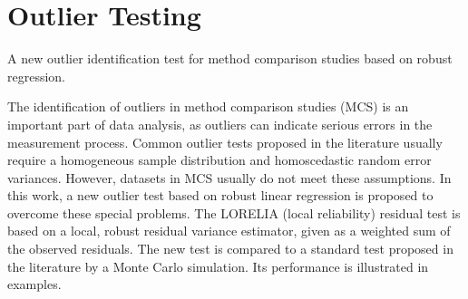 \documentclass[Chap3main.tex]{subfiles}
\begin{document}
	
	\section{Outlier Testing} 
	A new outlier identification test for method comparison studies based on robust regression.

The identification of outliers in method comparison studies (MCS) is an important part of data analysis, as outliers can indicate serious errors in the measurement process. Common outlier tests proposed in the literature usually require a homogeneous sample distribution and homoscedastic random error variances. However, datasets in MCS usually do not meet these assumptions. In this work, a new outlier test based on robust linear regression is proposed to overcome these special problems. The LORELIA (local reliability) residual test is based on a local, robust residual variance estimator, given as a weighted sum of the observed residuals. The new test is compared to a standard test proposed in the literature by a Monte Carlo simulation. Its performance is illustrated in examples.
\end{document}

